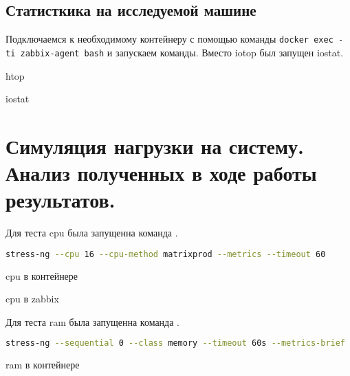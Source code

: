 \subsection{Статисткика на исследуемой машине}

Подключаемся к необходимому контейнеру с помощью команды
\texttt{docker exec -ti zabbix-agent bash} и запускаем команды.
Вместо iotop был запущен iostat.

\begin{image}
    \caption{htop}
    \label{fig:htop}
\end{image}

\begin{image}
    \caption{iostat}
    \label{fig:iostat}
\end{image}

\section{Симуляция нагрузки на систему.
Анализ полученных в ходе работы результатов.}

Для теста cpu была запущенна команда .

\begin{lstlisting}[language=bash]
stress-ng --cpu 16 --cpu-method matrixprod --metrics --timeout 60
\end{lstlisting}

\begin{image}
    \caption{cpu в контейнере}
    \label{fig:test:cpu}
\end{image}

\begin{image}
    \caption{cpu в zabbix}
    \label{fig:test:cpu:zab}
\end{image}


Для теста ram была запущенна команда .

\begin{lstlisting}[language=bash]
stress-ng --sequential 0 --class memory --timeout 60s --metrics-brief
\end{lstlisting}

\begin{image}
    \caption{ram в контейнере}
    \label{fig:test:ram}
\end{image}

